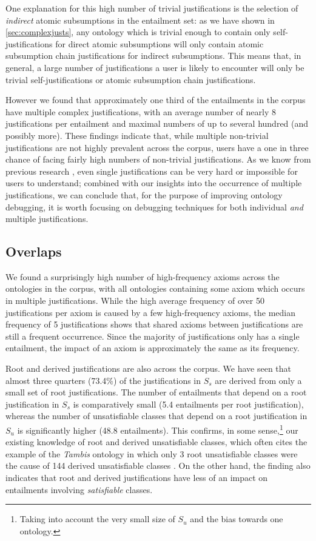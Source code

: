 One explanation for this high number of trivial justifications is the selection of \emph{indirect} atomic subsumptions in the entailment set: as we have shown in \ref{sec:complexjusts}, any ontology which is trivial enough to contain only self-justifications for direct atomic subsumptions will only contain atomic subsumption chain justifications for indirect subsumptions. This means that, in general, a large number of justifications a user is likely to encounter will only be trivial self-justifications or atomic subsumption chain justifications.

However we found that approximately one third of the entailments in the corpus have multiple complex justifications, with an average number of nearly 8 justifications per entailment and maximal numbers of up to several hundred (and possibly more). These findings indicate that, while multiple non-trivial justifications are not highly prevalent across the corpus, users have a one in three chance of facing fairly high numbers of non-trivial justifications. As we know from previous research \cite{horridge11gj}, even single justifications can be very hard or impossible for users to understand; combined with our insights into the occurrence of multiple justifications, we can conclude that,  for the purpose of improving ontology debugging, it is worth focusing on debugging techniques for both individual \emph{and} multiple justifications.


\subsection{Overlaps}

We found a surprisingly high number of high-frequency axioms across the ontologies in the corpus, with all ontologies containing some axiom which occurs in multiple justifications. While the high average frequency of over 50 justifications per axiom is caused by a few high-frequency axioms, the median frequency of 5 justifications shows that shared axioms between justifications are still a frequent occurrence. Since the majority of justifications only has a single entailment, the impact of an axiom is approximately the same as its frequency.

Root and derived justifications are also across the corpus. We have seen that almost three quarters (73.4\%) of the justifications in $S_{s}$ are derived from only a small set of root justifications. The number of entailments that depend on a root justification in $S_{s}$ is comparatively small (5.4 entailments per root justification), whereas the number of unsatisfiable classes that depend on a root justification in $S_{u}$ is significantly higher (48.8 entailments). This confirms, in some sense,\footnote{Taking into account the very small size of $S_{u}$ and the bias towards one ontology.} our existing knowledge of root and derived unsatisfiable classes, which often cites the example of the \emph{Tambis} ontology in which only 3 root unsatisfiable classes were the cause of 144 derived unsatisfiable classes \cite{kalyanpur06bh}. On the other hand, the finding also indicates that root and derived justifications have less of an impact on entailments involving \emph{satisfiable} classes.

